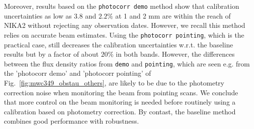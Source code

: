 Moreover, results based on the {\tt photocorr demo} method show that calibration
uncertainties as low as $3.8$ and $2.2\%$
at 1 and 2 mm are within the reach of NIKA2 without rejecting any
observation dates. However, we recall this method relies on 
accurate beam estimates. Using the {\tt photocorr pointing}, which is the
practical case, still decreases the calibration uncertainties
w.r.t. the baseline results but by a factor of about $20\%$ in both
bands. However, the differences between
the flux density ratios from {\tt demo} and {\tt pointing}, which are
seen e.g. from the 'photocorr demo' and 'photocorr pointing' of
Fig.~\ref{fig:mwc349_obstau_others}, are likely
to be due to the photometry correction noise
when monitoring the beam from pointing scans. We conclude that more
control on the beam monitoring is needed before routinely using a calibration
based on photometry correction. By contast, the baseline method
combines good performance with robustness.




